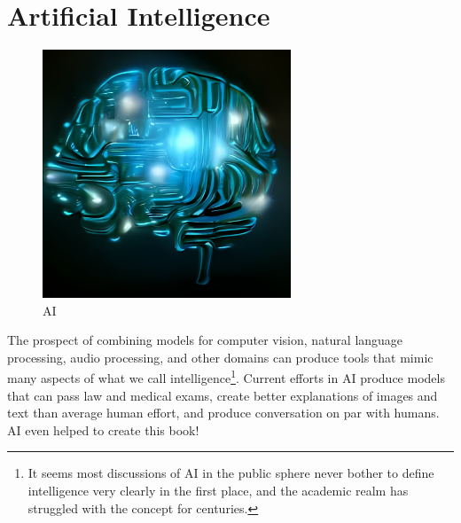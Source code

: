 \documentclass[
  letterpaper,
]{krantz}
\begin{document}
\section{Artificial Intelligence}\label{sec-ml-more-ai}

\begin{figure}[H]

{\centering \includegraphics[width=0.66\textwidth,height=\textheight]{img/ai_by_dalle.jpeg}

}

\caption{AI}

\end{figure}%

The prospect of combining models for computer vision, natural language
processing, audio processing, and other domains can produce tools that
mimic many aspects of what we call intelligence\footnote{It seems most
  discussions of AI in the public sphere never bother to define
  intelligence very clearly in the first place, and the academic realm
  has struggled with the concept for centuries.}. Current efforts in AI
produce models that can pass law and medical exams, create better
explanations of images and text than average human effort, and produce
conversation on par with humans. AI even helped to create this book!
\end{document}
